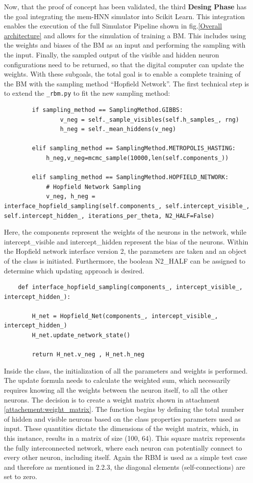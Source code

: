 Now, that the proof of concept has been validated, the third \textbf{Desing Phase} has the goal
integrating the \ac{mem-HNN} simulator into Scikit Learn. 
This integration enables the execution of the full Simulator Pipeline shown in fig.\ref{Overall architecture} and allows for the simulation of training a \ac{BM}.
This includes using the weights and biases of the \ac{BM} as an input and performing the sampling with the input.
Finally, the sampled output of the visible and hidden neuron configurations need to be returned, so that the digital computer can update the weights.
With these subgoals, the total goal is to enable a complete training of the \ac{BM} with the sampling method ``Hopfield Network''. 
The first technical step is to extend the \texttt{\_rbm.py} to fit the new sampling method: 
\begin{lstlisting}
        if sampling_method == SamplingMethod.GIBBS:
                v_neg = self._sample_visibles(self.h_samples_, rng)
                h_neg = self._mean_hiddens(v_neg)

        elif sampling_method == SamplingMethod.METROPOLIS_HASTING:
            h_neg,v_neg=mcmc_sample(10000,len(self.components_))

        elif sampling_method == SamplingMethod.HOPFIELD_NETWORK:  
            # Hopfield Network Sampling
            v_neg, h_neg = interface_hopfield_sampling(self.components_, self.intercept_visible_, self.intercept_hidden_, iterations_per_theta, N2_HALF=False)    
\end{lstlisting}
Here, the components represent the weights of the neurons in the network, while intercept\_visible and intercept\_hidden represent the bias of the neurons. 
Within the Hopfield network interface version 2, the parameters are taken and an object of the class is initiated. 
Furthermore, the boolean N2\_HALF can be assigned to determine which updating approach is desired. 
\begin{lstlisting}
    def interface_hopfield_sampling(components_, intercept_visible_, intercept_hidden_):
   
        H_net = Hopfield_Net(components_, intercept_visible_, intercept_hidden_)
        H_net.update_network_state()
        
        return H_net.v_neg , H_net.h_neg
\end{lstlisting}
Inside the class, the initialization of all the parameters and weights is performed. 
The update formula needs to calculate the weighted sum, which necessarily requires knowing all the weights between the neuron itself, to all the other neurons. 
The decision is to create a weight matrix shown in attachment \ref{attachement:weight_matrix}. 
The function begins by defining the total number of hidden and visible neurons based on the class properties parameters used as input.
These quantities dictate the dimensions of the weight matrix, which, in this instance, results in a matrix of size (100, 64).
This square matrix represents the fully interconnected network, where each neuron can potentially connect to every other neuron, including itself.
Again the \ac{RBM} is used as a simple test case and therefore as mentioned in 2.2.3, the diagonal elements (self-connections) are set to zero.

